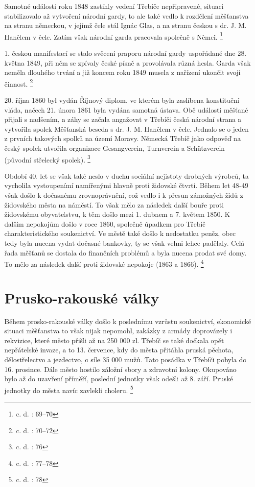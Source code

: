 \documentclass[a4paper,oneside,12p]{report}
\begin{document}
Samotné události roku 1848 zastihly vedení Třebíče nepřipravené, situaci stabilizovalo až vytvoření národní gardy, to ale také vedlo k rozdělení měšťanstva na stranu německou, v jejímž čele stál Ignác Glas, a na stranu českou s dr. J. M. Hanělem v čele.
Zatím však národní garda pracovala společně s Němci. \footnote{c. d. : 69--70}

1. českou manifestací se stalo svěcení praporu národní gardy uspořádané dne 28. května 1849, při něm se zpívaly české písně a provolávala různá hesla.
Garda však neměla dlouhého trvání a již koncem roku 1849 musela z nařízení ukončit svoji činnost. \footnote{c. d. : 70--72}

20. října 1860 byl vydán Říjnový diplom, ve kterém byla zaslíbena konstituční vláda, načech 21. února 1861 byla vydána samotná ústava.
Obě události měšťané přijali s nadšením, a záhy se začala angažovat v Třebíči česká národní strana a vytvořila spolek Měšťanská beseda s dr. J. M. Hanělem v čele.
Jednalo se o jeden z prvních takových spolků na území Moravy.
Německá Třebíč jako odpověď na český spolek utvořila organizace Gesangverein, Turnverein a Schützverein (původní střelecký spolek). \footnote{c. d. : 76}

Období 40. let se však také neslo v duchu sociální nejistoty drobných výrobců, ta vycholila vystoupenímí namířenými hlavně proti židovské čtvrti.
Během let 48-49 však došlo k dočasnému zrovnoprávnění, což vedlo i k přesun zámožných židů z židovského města na náměstí.
To však mělo za následek další bouře proti židovskému obyvatelstvu, k těm došlo mezi 1. dubnem a 7. květem 1850.
K dalším nepokojům došlo v roce 1860, společně úpadkem pro Třebíč charakteristického soukenictví.
Ve městě také došlo k nedostatku peněz, obec tedy byla nucena vydat dočasné bankovky, ty se však velmi lehce padělaly.
Celá řada měšťanů se dostala do finančních problémů a byla nucena prodat své domy.
To mělo za následek další proti židovské nepokoje (1863 a 1866). \footnote{c. d. : 77--78}

\section{Prusko-rakouské války}

Během prosko-rakouské války došlo k poslednímu vzrůstu soukenictví, ekonomické situaci měšťanstva to však nijak nepomohl, zakázky z armády doprovázely i rekvizice, které město přišli až na 250 000 zl.
Třebíč se také dočkala opět nepřátelské invaze, a to 13. července, kdy do města přitáhla pruská pěchota, dělostřelectvo a jezdectvo, o síle 35 000 mužů.
Tato posádka v Třebíči pobyla do 16. prosince.
Dále město hostilo záložní sbory a zdravotní kolony.
Okupováno bylo až do uzavření příměří, poslední jednotky však odešli až 8. září.
Pruské jednotky do města navíc zavlekli choleru. \footnote{c. d. : 78}
\end{document}

